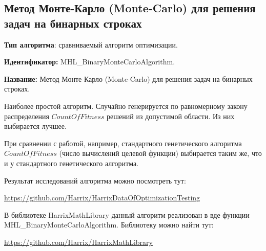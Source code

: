 \subsection{Метод Монте-Карло (Monte-Carlo) для решения задач на бинарных строках}\label{HarrixOptimizationAlgorithms:MHL_BinaryMonteCarloAlgorithm}

\textbf{Тип алгоритма}: сравниваемый алгоритм оптимизации.

\textbf{Идентификатор:} MHL\_BinaryMonteCarloAlgorithm.

\textbf{Название:} Метод Монте-Карло (Monte-Carlo) для решения задач на бинарных строках.

Наиболее простой алгоритм. Случайно генерируется по равномерному закону распределения $ CountOfFitness $ решений из допустимой области. Из них выбирается лучшее.

При сравнении с работой, например, стандартного генетического алгоритма $ CountOfFitness $ (число вычислений целевой функции) выбирается таким же, что и у стандартного генетического алгоритма.

Результат исследований алгоритма можно посмотреть тут:

\href{https://github.com/Harrix/HarrixDataOfOptimizationTesting}{https://github.com/Harrix/HarrixDataOfOptimizationTesting}

В библиотеке HarrixMathLibrary данный алгоритм реализован в вде функции MHL\_BinaryMonteCarloAlgorithm. Библиотеку можно найти тут:

\href{https://github.com/Harrix/HarrixMathLibrary}{https://github.com/Harrix/HarrixMathLibrary}